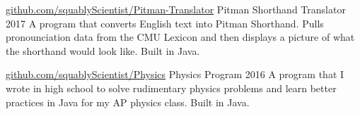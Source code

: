 \documentclass{awesome-cv}
\begin{document}
		\begin{cventries}
			\cventry
				{\href{https://github.com/squablyScientist/Pitman-Translator}{github.com/squablyScientist/Pitman-Translator}}
				{Pitman Shorthand Translator}
				{2017}
				{}
				{A program that converts English text into Pitman Shorthand. Pulls pronounciation data from the CMU Lexicon and then displays a picture of what the shorthand would look like. Built in Java.}

			\cventry
				{\href{https://github.com/squablyScientist/Physics}{github.com/squablyScientist/Physics}}
				{Physics Program}
				{2016}
				{}
				{A program that I wrote in high school to solve rudimentary physics problems and learn better practices in Java for my AP physics class. Built in Java.}
		\end{cventries}
	\vspace{0.25cm}
\end{document}
